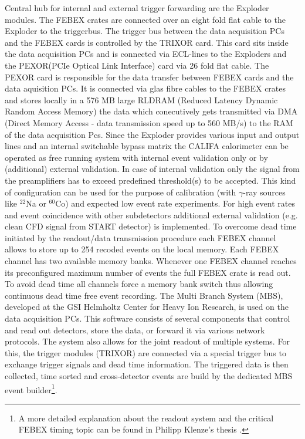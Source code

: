 Central hub for internal and external trigger forwarding are the Exploder modules\cite{exploder:gsi}. The FEBEX crates are connected over an eight fold flat cable to the Exploder to the triggerbus. The trigger bus between the data acquisition PCs and the FEBEX cards is controlled by the TRIXOR card. This card sits inside the data acquisition PCs and is connected via ECL-lines to the Exploders and the PEXOR(PCIe Optical Link Interface) card via 26 fold flat cable. The PEXOR card is responsible for the data transfer between FEBEX cards and the data aquisition PCs. It is connected via glas fibre cables to the FEBEX crates and stores locally in a 576 MB large RLDRAM (Reduced Latency Dynamic Random Access Memory) the data which conecutively gets transmitted  via DMA (Direct Memory Access - data transmission speed up to 560 MB/s) to the RAM of the data acquisition Pcs.\newline
Since the Exploder provides various input and output lines and an internal switchable bypass matrix the CALIFA calorimeter can be operated as free running system with internal event validation only or by (additional) external validation. In case of internal validation only the signal from the preamplifiers has to exceed predefined threshold(s) to be accepted. This kind of configuration can be used for  the purpose of calibration (with $\gamma$-ray sources like $^{22}$Na or $^{60}$Co) and expected low event rate experiments. For high event rates and event coincidence with other subdetectors additional external validation (e.g. clean CFD signal from START detector) is implemented.\newline
To overcome dead time initiated by the readout/data transmission procedure each FEBEX channel allows to store up to 254 recoded events on the local memory. Each FEBEX channel has two available memory banks. Whenever one FEBEX channel reaches its preconfigured maximum number of events the full FEBEX crate is read out. To avoid dead time all channels force a  memory bank switch thus allowing  continuous  dead time free event recording.\newline
The Multi Branch System (MBS), developed at the GSI Helmholtz Center for Heavy Ion Research, is used on the data acquisition PCs. This software consists of several components that control and read out detectors, store the data, or forward it via various network protocols. The system also allows for the joint readout of multiple systems. For this, the trigger modules (TRIXOR) are connected via a special trigger bus to exchange trigger signals and dead time information. The triggered data is then collected, time sorted and cross-detector events are build by the dedicated MBS event builder\footnote{A more detailed explanation about the readout system and the critical FEBEX timing topic can be found in Philipp Klenze's thesis \cite{pklenze}.}. 

